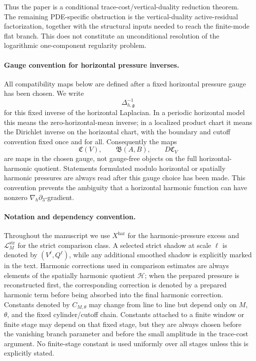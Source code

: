\documentclass[11pt]{article}
\numberwithin{equation}{section}
\theoremstyle{plain}
\theoremstyle{definition}
\theoremstyle{remark}
\newcommand{\har}{\mathrm{har}}
\newcommand{\str}{\mathrm{str}}
\newcommand{\calH}{\mathcal H}
\newcommand{\calL}{\mathcal L}
\begin{document}
Thus the paper is a conditional trace-cost/vertical-duality reduction theorem.  The remaining PDE-specific obstruction is the vertical-duality active-residual factorization, together with the structural inputs needed to reach the finite-mode flat branch.  This does not constitute an unconditional resolution of the logarithmic one-component regularity problem.


\paragraph{Gauge convention for horizontal pressure inverses.}
All compatibility maps below are defined after a fixed horizontal pressure gauge has been chosen.  We write
\[
        \Delta_{h,\mathfrak g}^{-1}
\]
for this fixed inverse of the horizontal Laplacian.  In a periodic horizontal model this means the zero-horizontal-mean inverse; in a localized product chart it means the Dirichlet inverse on the horizontal chart, with the boundary and cutoff convention fixed once and for all.  Consequently the maps
\[
        \mathfrak C(V),\qquad \mathfrak B(A,B),\qquad D\mathfrak C_V
\]
are maps in the chosen gauge, not gauge-free objects on the full horizontal-harmonic quotient.  Statements formulated modulo horizontal or spatially harmonic pressures are always read after this gauge choice has been made.  This convention prevents the ambiguity that a horizontal harmonic function can have nonzero \(\nabla_h\partial_3\)-gradient.

\paragraph{Notation and dependency convention.}
Throughout the manuscript we use \(X^{\har}\) for the harmonic-pressure excess and \(\calL_M^{\str}\) for the strict comparison class.  A selected strict shadow at scale \(\ell\) is denoted by \((V^\ell,Q^\ell)\), while any additional smoothed shadow is explicitly marked in the text.  Harmonic corrections used in comparison estimates are always elements of the spatially harmonic quotient \(\calH\); when the prepared pressure is reconstructed first, the corresponding correction is denoted by a prepared harmonic term before being absorbed into the final harmonic correction.  Constants denoted by \(C_{M,\theta}\) may change from line to line but depend only on \(M\), \(\theta\), and the fixed cylinder/cutoff chain.  Constants attached to a finite window or finite stage may depend on that fixed stage, but they are always chosen before the vanishing branch parameter and before the small amplitude in the trace-cost argument.  No finite-stage constant is used uniformly over all stages unless this is explicitly stated.
\end{document}
